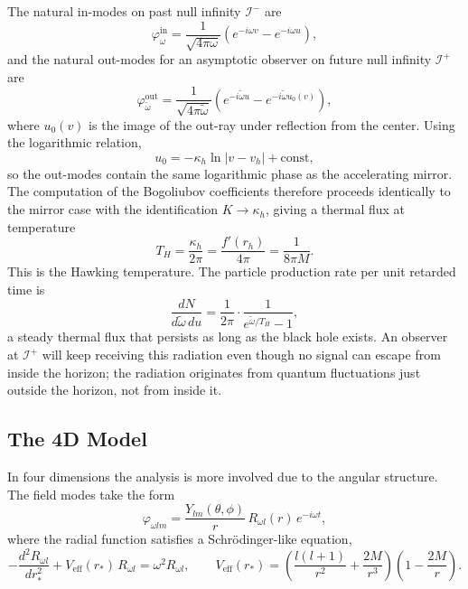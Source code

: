 The natural in-modes on past null infinity $\mathscr{I}^-$ are
\begin{equation}
    \varphi^{\text{in}}_\omega
    = \frac{1}{\sqrt{4\pi\omega}}
    \left(e^{-i\omega v} - e^{-i\omega u}\right),
\end{equation}
and the natural out-modes for an asymptotic observer on future null
infinity $\mathscr{I}^+$ are
\begin{equation}
    \varphi^{\text{out}}_{\tilde\omega}
    = \frac{1}{\sqrt{4\pi\tilde\omega}}
    \left(e^{-i\tilde\omega u}
    - e^{-i\tilde\omega u_0(v)}\right),
\end{equation}
where $u_0(v)$ is the image of the out-ray under reflection from the
center. Using the logarithmic relation,
\begin{equation}
    u_0 = -\kappa_h\ln|v - v_h| + \text{const},
\end{equation}
so the out-modes contain the same logarithmic phase as the accelerating
mirror. The computation of the Bogoliubov coefficients therefore
proceeds identically to the mirror case with the identification
$K\to\kappa_h$, giving a thermal flux at temperature
\begin{equation}
    \boxed{T_H = \frac{\kappa_h}{2\pi}
    = \frac{f'(r_h)}{4\pi}
    = \frac{1}{8\pi M}.}
\end{equation}
This is the Hawking temperature. The particle production rate per unit
retarded time is
\begin{equation}
    \frac{dN}{d\tilde\omega\,du}
    = \frac{1}{2\pi}\cdot\frac{1}{e^{\tilde\omega/T_H}-1},
\end{equation}
a steady thermal flux that persists as long as the black hole exists.
An observer at $\mathscr{I}^+$ will keep receiving this radiation even
though no signal can escape from inside the horizon; the radiation
originates from quantum fluctuations just outside the horizon, not
from inside it.

\subsection*{The 4D Model}

In four dimensions the analysis is more involved due to the angular
structure. The field modes take the form
\begin{equation}
    \varphi_{\omega lm}
    = \frac{Y_{lm}(\theta,\phi)}{r}\,R_{\omega l}(r)\,e^{-i\omega t},
\end{equation}
where the radial function satisfies a Schr\"{o}dinger-like equation,
\begin{equation}
    -\frac{d^2R_{\omega l}}{dr_*^2}
    + V_{\text{eff}}(r_*)\,R_{\omega l} = \omega^2 R_{\omega l},
    \qquad
    V_{\text{eff}}(r_*) = \left(\frac{l(l+1)}{r^2}
    + \frac{2M}{r^3}\right)\left(1-\frac{2M}{r}\right).
\end{equation}

